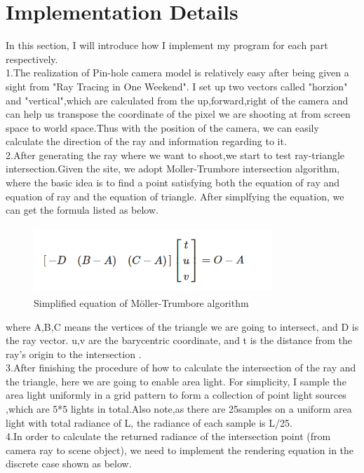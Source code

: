 \documentclass[acmtog]{acmart}
\begin{document}
\section{Implementation Details}
\qquad In this section, I will introduce how I implement my program for each part respectively.
\\\indent 1.The realization of Pin-hole camera model is relatively easy after being given a sight from "Ray Tracing in One Weekend". I set up two vectors called "horzion" and "vertical",which are calculated from the up,forward,right of the camera and can help us transpose the coordinate of the pixel we are shooting at from screen space to world space.Thus with the position of the camera, we can easily calculate the direction of the ray and information regarding to it. 
\\\indent 2.After generating the ray where we want to shoot,we start to test ray-triangle intersection.Given the site, we adopt Moller-Trumbore intersection algorithm, where the basic idea is to find a point satisfying both the equation of ray and equation of ray and the equation of triangle. After simplfying the equation, we can get the formula listed as below.
\begin{figure}[h]
	\centering
	\includegraphics[width=9cm,height=2.5cm]{equation1.PNG}
	\caption{Simplified equation of Möller-Trumbore algorithm}
\end{figure}
where A,B,C means the vertices of the triangle we are going to intersect, and D is the ray vector. u,v are the  barycentric coordinate, and t is the distance from the ray's origin to the intersection .
\\\indent 3.After finishing the procedure of how to calculate the intersection of the ray and the triangle, here we are going to enable area light. For simplicity, I sample the area light uniformly in a grid pattern to form a collection of point light sources ,which are 5*5 lights in total.Also note,as there are 25samples on a uniform area light with total radiance of L, the radiance of each sample is L/25.
\\\indent 4.In order to calculate the returned radiance of the intersection point (from camera ray to scene object), we need to implement the rendering equation in the discrete case shown as below.
\end{document}
